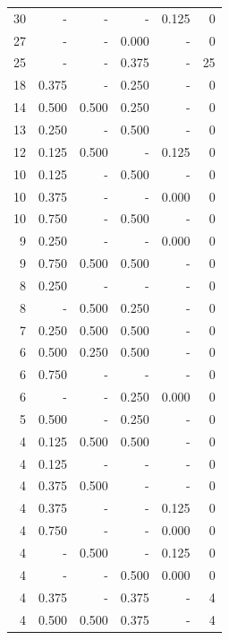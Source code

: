 \documentclass[a4paper]{article}\usepackage{graphicx, color}
\begin{document}
\begin{table}[ht]
\begin{tabular}{rrrrrr}
   \rowcolor{nullColor} 30 & - & - & - & 0.125 & 0 \\ 
   \rowcolor{sosoColor} 27 & - & - & 0.000 & - & 0 \\ 
   \rowcolor{sosoColor} 25 & - & - & 0.375 & - & 25 \\ 
   \rowcolor{sosoColor} 18 & 0.375 & - & 0.250 & - & 0 \\ 
   \rowcolor{badColor} 14 & 0.500 & 0.500 & 0.250 & - & 0 \\ 
   \rowcolor{sosoColor} 13 & 0.250 & - & 0.500 & - & 0 \\ 
  12 & 0.125 & 0.500 & - & 0.125 & 0 \\ 
   \rowcolor{sosoColor} 10 & 0.125 & - & 0.500 & - & 0 \\ 
   \rowcolor{nullColor} 10 & 0.375 & - & - & 0.000 & 0 \\ 
   \rowcolor{sosoColor} 10 & 0.750 & - & 0.500 & - & 0 \\ 
   \rowcolor{nullColor} 9 & 0.250 & - & - & 0.000 & 0 \\ 
   \rowcolor{goodColor} 9 & 0.750 & 0.500 & 0.500 & - & 0 \\ 
   \rowcolor{nullColor} 8 & 0.250 & - & - & - & 0 \\ 
   \rowcolor{badColor} 8 & - & 0.500 & 0.250 & - & 0 \\ 
   \rowcolor{goodColor} 7 & 0.250 & 0.500 & 0.500 & - & 0 \\ 
   \rowcolor{badColor} 6 & 0.500 & 0.250 & 0.500 & - & 0 \\ 
   \rowcolor{nullColor} 6 & 0.750 & - & - & - & 0 \\ 
   \rowcolor{sosoColor} 6 & - & - & 0.250 & 0.000 & 0 \\ 
   \rowcolor{sosoColor} 5 & 0.500 & - & 0.250 & - & 0 \\ 
   \rowcolor{goodColor} 4 & 0.125 & 0.500 & 0.500 & - & 0 \\ 
   \rowcolor{nullColor} 4 & 0.125 & - & - & - & 0 \\ 
  4 & 0.375 & 0.500 & - & - & 0 \\ 
   \rowcolor{nullColor} 4 & 0.375 & - & - & 0.125 & 0 \\ 
   \rowcolor{nullColor} 4 & 0.750 & - & - & 0.000 & 0 \\ 
  4 & - & 0.500 & - & 0.125 & 0 \\ 
   \rowcolor{sosoColor} 4 & - & - & 0.500 & 0.000 & 0 \\ 
   \rowcolor{sosoColor} 4 & 0.375 & - & 0.375 & - & 4 \\ 
  4 & 0.500 & 0.500 & 0.375 & - & 4 \\ 

\end{tabular}
\end{table}
\end{document}
